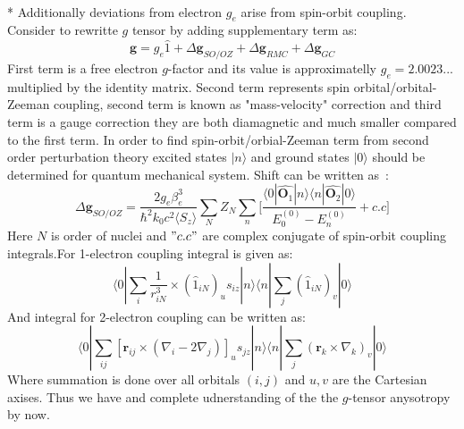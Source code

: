 \\*
Additionally deviations from electron $g_e$ arise from spin-orbit coupling. Consider to rewritte $g$ tensor by adding supplementary term as:
\begin{equation}\label{eq:gtenelec}
\pmb{g}=g_e\hat1+\Delta \pmb{g}_{SO/OZ}+\Delta\pmb{g}_{RMC}+\Delta\pmb{g}_{GC}
\end{equation} 
First term is a free electron $g$-factor and its value is approximatelly $g_e=2.0023...$ multiplied by the identity matrix. Second term represents spin orbital/orbital-Zeeman coupling, second term is known as "mass-velocity" correction and third term is a gauge correction they are both diamagnetic and much smaller compared to the first term. In order to find spin-orbit/orbial-Zeeman term from second order perturbation theory excited states $|n\rangle$ and ground states $|0\rangle$ should be determined for quantum mechanical system. Shift can be written as~\cite{thesis1}:  
\begin{equation}\label{eq:zeemanparamagn}
\Delta \pmb{g}_{SO/OZ}=\frac{2g_e\beta_e^3}{\hbar^2k_0c^2\langle S_z\rangle}\sum_N Z_N\sum_n\Bigg[ \frac{\langle0|\hat{\pmb{O}_1}|n\rangle\langle n|\hat{\pmb{O}_2}|0\rangle}{E_0^{(0)}-E_n^{(0)}}+c.c\Bigg]
\end{equation} 
Here $N$ is order of nuclei and $"c.c"$ are complex conjugate of spin-orbit coupling integrals.For 1-electron coupling integral is given as:
\begin{equation}\label{eq:oneel1}
\langle 0|\sum_i\frac{1}{r^3_{iN}}\times(\hat1_{iN})_us_{iz}|n\rangle\langle n|\sum_j(\hat1_{iN})_v|0\rangle
\end{equation}
And integral for 2-electron coupling can be written as:
\begin{equation}\label{eq:oneel2}
\langle 0|\sum_{ij}[\pmb{r}_{ij}\times(\nabla_i-2\nabla_j)]_us_{jz}|n\rangle\langle n|\sum_j(\pmb{r}_k\times\nabla_k)_v|0\rangle
\end{equation}
Where summation is done over all orbitals $(i,j)$ and $u,v$ are the Cartesian axises. Thus we have and complete udnerstanding of the the $g$-tensor anysotropy by now. 
